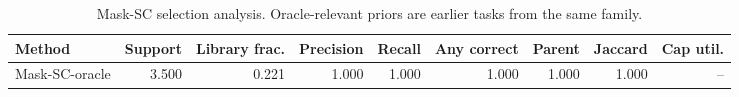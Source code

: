 \begin{table}[ht]
    \caption{Mask-SC selection analysis. Oracle-relevant priors are earlier tasks from the same family.}
    \label{tbl:masksc_selection}
    \centering
    \scriptsize
    \begin{tabular}{lrrrrrrrr}
    \toprule
Method & Support & Library frac. & Precision & Recall & Any correct & Parent & Jaccard & Cap util. \\
    \midrule
Mask-SC-oracle & 3.500 & 0.221 & 1.000 & 1.000 & 1.000 & 1.000 & 1.000 & -- \\
    \bottomrule
    \end{tabular}
\end{table}
